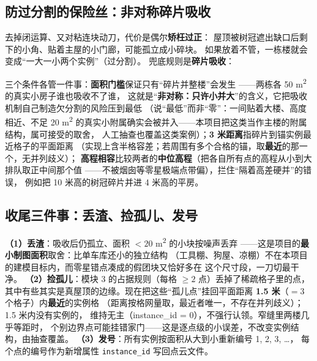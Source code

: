 \subsection{防过分割的保险丝：非对称碎片吸收}

去掉闭运算、又对粘连块动刀，代价是偶尔\textbf{矫枉过正}：
屋顶被树冠遮出缺口后剩下的小角、贴着主屋的小门廊，可能孤立成小碎块。
如果放着不管，一栋楼就会变成``一大一小两个实例''（过分割）。
兜底规则是\textbf{碎片吸收}：

\begin{center}
\end{center}

三个条件各管一件事：\textbf{面积门槛}保证只有``碎片并整楼''会发生
——两栋各 50 m\textsuperscript{2} 的真实小房子谁也吸收不了谁，
这就是``\textbf{非对称：只许小并大}''的含义，它把吸收机制自己制造欠分割的风险压到最低
（说``最低''而非``零''：一间贴着大楼、高度相近、不足 20 m\textsuperscript{2}
的真实小附属确实会被并入——本项目把这类当作主楼的附属结构，属可接受的取舍，
人工抽查也覆盖这类案例）；\textbf{3 米距离}指碎片到锚实例最近格子的平面距离
（实现上含半格容差；若周围有多个合格的锚，取\textbf{最近}的那一个，无并列歧义）；
\textbf{高程相容}比较两者的\textbf{中位高程}（把各自所有点的高程从小到大排队取正中间那个值
——不被烟囱等零星极端点带偏），拦住``隔着高差硬并''的错误，
例如把 10 米高的树冠碎片并进 4 米高的平房。

\subsection{收尾三件事：丢渣、捡孤儿、发号}

\textbf{（1）丢渣}：吸收后仍孤立、面积 $<20$ m\textsuperscript{2} 的小块按噪声丢弃
——这是项目的\textbf{最小制图面积}取舍：比单车库还小的独立结构
（工具棚、狗屋、凉棚）不在本项目的建模目标内，而零星错点凑成的假团块又恰好多在
这个尺寸段，一刀切最干净。
\textbf{（2）捡孤儿}：模块 3 的占据规则（每格 $\geq2$ 点）丢掉了稀疏格子里的点，
其中有些其实是真屋顶的边缘。现在把这些``孤儿点''挂回平面距离 \textbf{1.5 米}（$=3$ 个格子）内\textbf{最近}的实例格
（距离按格网量取，最近者唯一，不存在并列歧义）；1.5 米内没有实例的，
维持无主（instance\_id = 0），不强行认领。窄缝里两楼几乎等距时，
个别边界点可能挂错家门——这是逐点级的小误差，不改变实例结构，由抽查覆盖。
\textbf{（3）发号}：所有实例按面积从大到小重新编号 1, 2, 3, \dots，
每个点的编号作为新增属性 \texttt{instance\_id} 写回点云文件。

